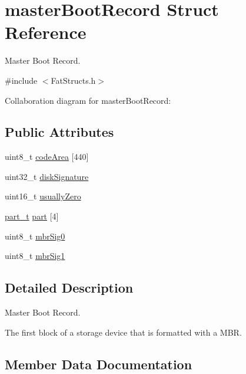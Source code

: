 \hypertarget{structmaster_boot_record}{}\section{master\+Boot\+Record Struct Reference}
\label{structmaster_boot_record}


Master Boot Record.  




{\ttfamily \#include $<$Fat\+Structs.\+h$>$}



Collaboration diagram for master\+Boot\+Record\+:
\subsection*{Public Attributes}
\begin{DoxyCompactItemize}
\item 
uint8\+\_\+t \hyperlink{structmaster_boot_record_a26ca1fb4ebbff2cc1a54153b1dfcd688}{code\+Area} \mbox{[}440\mbox{]}
\item 
uint32\+\_\+t \hyperlink{structmaster_boot_record_a77151c641444c0653ff71a253f0423ef}{disk\+Signature}
\item 
uint16\+\_\+t \hyperlink{structmaster_boot_record_afacfc863e98f64053cd9459c6dec948f}{usually\+Zero}
\item 
\hyperlink{_fat_structs_8h_a37251e7d5c69a159be727a3fc8c9d0e6}{part\+\_\+t} \hyperlink{structmaster_boot_record_aa4e294e50f311635c10c92f4c99227c5}{part} \mbox{[}4\mbox{]}
\item 
uint8\+\_\+t \hyperlink{structmaster_boot_record_a42b0b413ecb21ac5314d4f6bca05308f}{mbr\+Sig0}
\item 
uint8\+\_\+t \hyperlink{structmaster_boot_record_aafbbcb4f6a2d1181c6458d4c9603df4f}{mbr\+Sig1}
\end{DoxyCompactItemize}


\subsection{Detailed Description}
Master Boot Record. 

The first block of a storage device that is formatted with a M\+BR. 

\subsection{Member Data Documentation}
\mbox{\label{structmaster_boot_record_a26ca1fb4ebbff2cc1a54153b1dfcd688}} 
